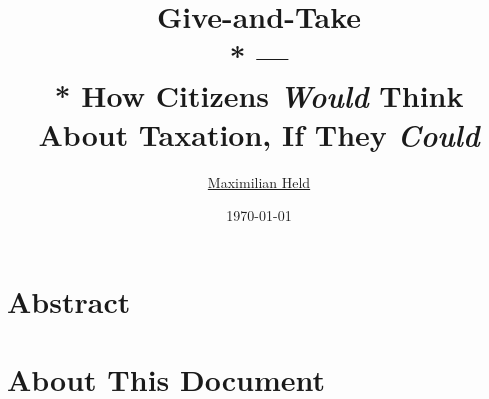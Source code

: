 \documentclass[11pt,a4paper,openright,oneside,titlepage,english]{book}
\title{
	Give-and-Take
	\\*
	---
	\\*
	How Citizens \emph{Would} Think About Taxation, If They \emph{Could}
}
\author{
	\href{http://www.maxheld.de}{Maximilian Held}
}
\date{
	\today
}
\begin{document}
	\maketitle
	
	\setcounter{page}{3}
	\chapter*{Abstract}
		\label{chap:abstract}
		\immediate{} %
	\chapter*{About This Document}
		\label{chap:how2}
		
	\tableofcontents
	\listoffigures
	\listoftables
% 	
\mainmatter
% 	
% 	
\end{document}
